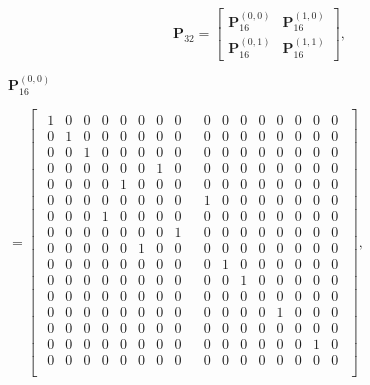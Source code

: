 \documentclass{jtacs}
\numberwithin{equation}{section}
\begin{document}
\[
\mathbf{P}_{32}=\left[
\begin{array}{ll}
\mathbf{P}_{16}^{(0,0)} & \mathbf{P}_{16}^{(1,0)} \\
\mathbf{P}_{16}^{(0,1)} & \mathbf{P}_{16}^{(1,1)}
\end{array}\right],
\]
\begin{center}
$\mathbf{P}_{16}^{(0,0)}$
\begin{adjustbox}{width=0.55\textwidth, margin= 0 5 0 0}
$
=\left[
\begin{array}{cc}
\begin{matrix}
1 & 0 & 0 & 0 & 0 & 0 & 0 & 0 \\
0 & 1 & 0 & 0 & 0 & 0 & 0 & 0 \\
0 & 0 & 1 & 0 & 0 & 0 & 0 & 0 \\
0 & 0 & 0 & 0 & 0 & 0 & 1 & 0 \\
0 & 0 & 0 & 0 & 1 & 0 & 0 & 0 \\
0 & 0 & 0 & 0 & 0 & 0 & 0 & 0 \\
0 & 0 & 0 & 1 & 0 & 0 & 0 & 0 \\
0 & 0 & 0 & 0 & 0 & 0 & 0 & 1 \\
0 & 0 & 0 & 0 & 0 & 1 & 0 & 0 \\
0 & 0 & 0 & 0 & 0 & 0 & 0 & 0 \\
0 & 0 & 0 & 0 & 0 & 0 & 0 & 0 \\
0 & 0 & 0 & 0 & 0 & 0 & 0 & 0 \\
0 & 0 & 0 & 0 & 0 & 0 & 0 & 0 \\
0 & 0 & 0 & 0 & 0 & 0 & 0 & 0 \\
0 & 0 & 0 & 0 & 0 & 0 & 0 & 0 \\
0 & 0 & 0 & 0 & 0 & 0 & 0 & 0 \\
\end{matrix}
&
\begin{matrix}
0 & 0 & 0 & 0 & 0 & 0 & 0 & 0 \\
0 & 0 & 0 & 0 & 0 & 0 & 0 & 0 \\
0 & 0 & 0 & 0 & 0 & 0 & 0 & 0 \\
0 & 0 & 0 & 0 & 0 & 0 & 0 & 0 \\
0 & 0 & 0 & 0 & 0 & 0 & 0 & 0 \\
1 & 0 & 0 & 0 & 0 & 0 & 0 & 0 \\
0 & 0 & 0 & 0 & 0 & 0 & 0 & 0 \\
0 & 0 & 0 & 0 & 0 & 0 & 0 & 0 \\
0 & 0 & 0 & 0 & 0 & 0 & 0 & 0 \\
0 & 1 & 0 & 0 & 0 & 0 & 0 & 0 \\
0 & 0 & 1 & 0 & 0 & 0 & 0 & 0 \\
0 & 0 & 0 & 0 & 0 & 0 & 0 & 0 \\
0 & 0 & 0 & 0 & 1 & 0 & 0 & 0 \\
0 & 0 & 0 & 0 & 0 & 0 & 0 & 0 \\
0 & 0 & 0 & 0 & 0 & 0 & 1 & 0 \\
0 & 0 & 0 & 0 & 0 & 0 & 0 & 0 \\
\end{matrix}
\end{array}
\right],
$
\end{adjustbox}\end{center}
\end{document}
